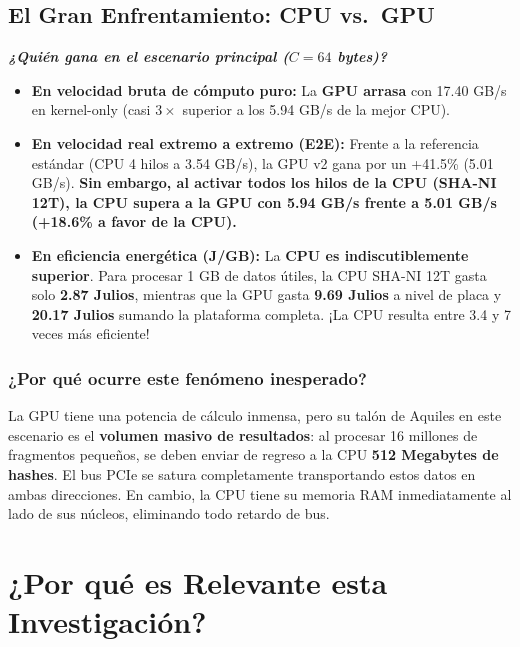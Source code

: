 \documentclass[11pt,a4paper]{article}
\newcommand{\destacado}[1]{%
    \par\vspace{0.8em}%
    \noindent\colorbox{boxbg}{%
        \parbox{\dimexpr\textwidth-2\fboxsep\relax}{%
            \vspace{0.4em}%
            \raggedright\itshape #1%
            \vspace{0.4em}%
        }%
    }%
    \par\vspace{0.8em}%
}
\begin{document}
\subsection{El Gran Enfrentamiento: CPU vs.\ GPU}
\destacado{%
\textbf{¿Quién gana en el escenario principal ($C=64$ bytes)?}
\begin{itemize}[leftmargin=*]
    \item \textbf{En velocidad bruta de cómputo puro:} La \textbf{GPU arrasa} con 17.40 GB/s en kernel-only (casi $3\times$ superior a los 5.94 GB/s de la mejor CPU).
    \item \textbf{En velocidad real extremo a extremo (E2E):} Frente a la referencia estándar (CPU 4 hilos a 3.54 GB/s), la GPU v2 gana por un +41.5\% (5.01 GB/s). \textbf{Sin embargo, al activar todos los hilos de la CPU (SHA-NI 12T), la CPU supera a la GPU con 5.94 GB/s frente a 5.01 GB/s (+18.6\% a favor de la CPU).}
    \item \textbf{En eficiencia energética (J/GB):} La \textbf{CPU es indiscutiblemente superior}. Para procesar 1 GB de datos útiles, la CPU SHA-NI 12T gasta solo \textbf{2.87 Julios}, mientras que la GPU gasta \textbf{9.69 Julios} a nivel de placa y \textbf{20.17 Julios} sumando la plataforma completa. ¡La CPU resulta entre 3.4 y 7 veces más eficiente!
\end{itemize}
}

\subsubsection{¿Por qué ocurre este fenómeno inesperado?}
La GPU tiene una potencia de cálculo inmensa, pero su talón de Aquiles en este escenario es el \textbf{volumen masivo de resultados}: al procesar 16 millones de fragmentos pequeños, se deben enviar de regreso a la CPU \textbf{512 Megabytes de hashes}. El bus PCIe se satura completamente transportando estos datos en ambas direcciones. En cambio, la CPU tiene su memoria RAM inmediatamente al lado de sus núcleos, eliminando todo retardo de bus.

\section{¿Por qué es Relevante esta Investigación?}
\end{document}
